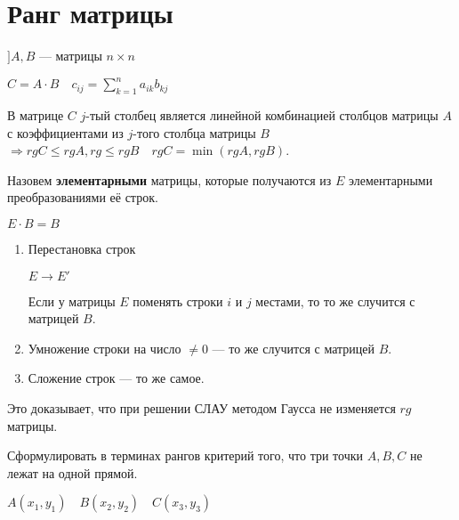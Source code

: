 

\cfoot{}



\section{Ранг матрицы}

$] A,B$ --- матрицы $n\times n$

$C = A\cdot B \quad c_{ij}=\sum\limits_{k=1}^n a_{ik}b_{kj}$

В матрице $C$ $j$-тый столбец является линейной комбинацией столбцов матрицы $A$ с коэффициентами из $j$-того столбца матрицы $B$ $\Rightarrow rg C \leq rg A, rg \leq rg B \quad rg C = \min(rg A, rg B)$.

\begin{definition}
    Назовем \textbf{элементарными} матрицы, которые получаются из $E$ элементарными преобразованиями её строк.
\end{definition}

$E\cdot B = B$

\begin{enumerate}
    \item Перестановка строк
    
    $E\to E'$

    Если у матрицы $E$ поменять строки $i$ и $j$ местами, то то же случится с матрицей $B$.

    \item Умножение строки на число $\not=0$ --- то же случится с матрицей $B$.
    \item Сложение строк --- то же самое.
\end{enumerate}

Это доказывает, что при решении СЛАУ методом Гаусса не изменяется $rg$ матрицы.

\begin{example}
    Сформулировать в терминах рангов критерий того, что три точки $A, B, C$ не лежат на одной прямой.
\end{example}

    $A(x_1, y_1) \quad B(x_2, y_2) \quad C(x_3, y_3)$

